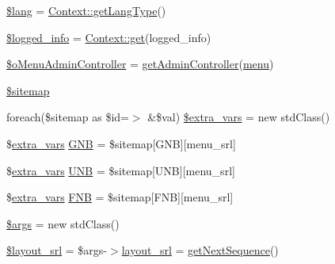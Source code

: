 \begin{DoxyCompactItemize}
\item 
\hyperlink{ko_8install_8php_a7714b111b644017933931ec69a154102}{\$lang} = \hyperlink{classContext_ae75d6f4064d09e48d0d76614b6997e29}{Context\+::get\+Lang\+Type}()
\item 
\hyperlink{ko_8install_8php_a193c1593ceb216e9fb05b0bad01ebbc8}{\$logged\+\_\+info} = \hyperlink{classContext_a90ce25d65fe6c9778421cbb36ab3def5}{Context\+::get}(\textquotesingle{}logged\+\_\+info\textquotesingle{})
\item 
\hyperlink{ko_8install_8php_a9062530c3b03479ca4530daee1c18887}{\$o\+Menu\+Admin\+Controller} = \hyperlink{func_8inc_8php_a2f7ca88a5226536aca3b2f5682bd7b2d}{get\+Admin\+Controller}(\textquotesingle{}\hyperlink{classmenu}{menu}\textquotesingle{})
\item 
\hyperlink{ko_8install_8php_ae7b8fee391a6d8b9162de5b69b9dc07f}{\$sitemap}
\item 
foreach(\$sitemap as \$id=$>$ \&\$val) \hyperlink{ko_8install_8php_a26886c066acce69293ed249c5b7b98fa}{\$extra\+\_\+vars} = new std\+Class()
\item 
\$\hyperlink{ko_8install_8php_ae1dcb37fc34a8f312d2e6abd6f806743}{extra\+\_\+vars} \hyperlink{ko_8install_8php_a9b1716b68fc04f3492448f38148dcbf5}{G\+NB} = \$sitemap\mbox{[}\textquotesingle{}G\+NB\textquotesingle{}\mbox{]}\mbox{[}\textquotesingle{}menu\+\_\+srl\textquotesingle{}\mbox{]}
\item 
\$\hyperlink{ko_8install_8php_ae1dcb37fc34a8f312d2e6abd6f806743}{extra\+\_\+vars} \hyperlink{ko_8install_8php_abc0cb1f57d83d4a106f4495c30e0df52}{U\+NB} = \$sitemap\mbox{[}\textquotesingle{}U\+NB\textquotesingle{}\mbox{]}\mbox{[}\textquotesingle{}menu\+\_\+srl\textquotesingle{}\mbox{]}
\item 
\$\hyperlink{ko_8install_8php_ae1dcb37fc34a8f312d2e6abd6f806743}{extra\+\_\+vars} \hyperlink{ko_8install_8php_a683e060c22be3e658be6f9751a2082f0}{F\+NB} = \$sitemap\mbox{[}\textquotesingle{}F\+NB\textquotesingle{}\mbox{]}\mbox{[}\textquotesingle{}menu\+\_\+srl\textquotesingle{}\mbox{]}
\item 
\hyperlink{ko_8install_8php_a67e94494731d99ed23b123e95175bc10}{\$args} = new std\+Class()
\item 
\hyperlink{ko_8install_8php_a77889723c4aa360089caae223118d413}{\$layout\+\_\+srl} = \$args-\/$>$\hyperlink{ko_8install_8php_a70054876db09b2519a1726663c8dd9e7}{layout\+\_\+srl} = \hyperlink{func_8inc_8php_a5a97b458f9c5b4fe3574671840aee27c}{get\+Next\+Sequence}()
\item 

\end{DoxyCompactItemize}
